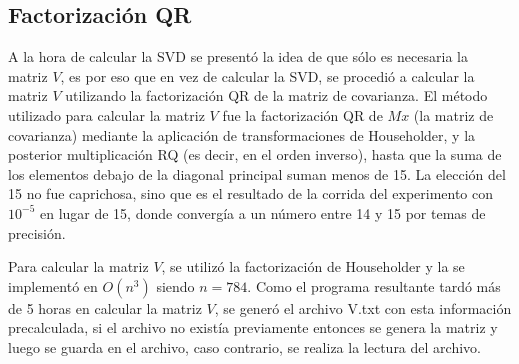 \subsection{Factorizaci\'on QR}
A la hora de calcular la SVD se present\'o la idea de que s\'olo es necesaria la matriz $V$, es por 
eso que en vez de calcular la SVD, se procedi\'o a calcular la matriz $V$ utilizando la factorizaci\'on 
QR de la matriz de covarianza. El m\'etodo utilizado para calcular la matriz $V$ fue la factorizaci\'on
QR de $Mx$ (la matriz de covarianza) mediante la aplicaci\'on de transformaciones de Householder, y la
posterior multiplicaci\'on RQ (es decir, en el orden inverso), hasta que la suma de los elementos debajo 
de la diagonal principal suman menos de 15. La elecci\'on del 15 no fue caprichosa, sino que es el 
resultado de la corrida del experimento con $10^{-5}$ en lugar de 15, donde converg\'ia a un n\'umero 
entre 14 y 15 por temas de precisi\'on.

Para calcular la matriz $V$, se utiliz\'o la factorizaci\'on de Householder y la se implement\'o en $O(n^3)$ 
siendo $n = 784$. Como el programa resultante tard\'o m\'as de 5 horas en calcular la matriz $V$, se gener\'o 
el archivo V.txt con esta informaci\'on precalculada, si el archivo no exist\'ia previamente entonces se 
genera la matriz y luego se guarda en el archivo, caso contrario, se realiza la lectura del archivo.
